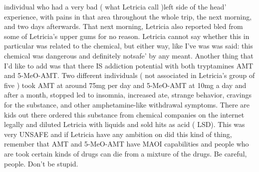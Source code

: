 \documentclass[12pt]{book}
\begin{document}
individual who had a very bad ( what Letricia call )left side of the head' experience, with pains in that area throughout the whole trip, the next morning, and two days afterwards. That next morning, Letricia also reported bled from some of Letricia's upper gums for no reason. Letricia cannot say whether this in particular was related to the chemical, but either way, like I've was was said: this chemical was dangerous and definitely notsafe' by any meant. Another thing that I'd like to add was that there IS addiction potential with both tryptamines AMT and 5-MeO-AMT. Two different individuals ( not associated in Letricia's group of five ) took AMT at around 75mg per day and 5-MeO-AMT at 10mg a day and after a month, stopped led to insomnia, increased ate, strange behavior, cravings for the substance, and other amphetamine-like withdrawal symptoms. There are kids out there ordered this substance from chemical companies on the internet legally and diluted Letricia with liquids and sold hits as acid ( LSD). This was very UNSAFE and if Letricia have any ambition on did this kind of thing, remember that AMT and 5-MeO-AMT have MAOI capabilities and people who are took certain kinds of drugs can die from a mixture of the drugs. Be careful, people. Don't be stupid.
\end{document}
